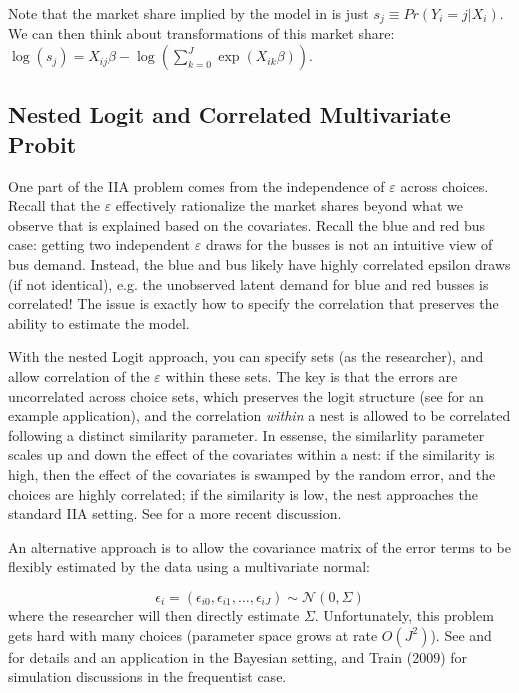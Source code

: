 \documentclass{tufte-handout}
\theoremstyle{break}
\begin{document}
Note that the market share implied by the model in  is just $s_{j} \equiv Pr(Y_{i}=j|X_{i})$. We can then think about transformations of this market share: $\log(s_{j}) = X_{ij}\beta - \log(\sum_{k=0}^{J}\exp(X_{ik}\beta))$. 

\subsection{Nested Logit and Correlated Multivariate Probit}

One part of the IIA problem comes from the independence of $\varepsilon$ across choices. Recall that the $\varepsilon$ effectively rationalize the market shares beyond what we observe that is explained based on the covariates. Recall the blue and red bus case: getting two independent $\varepsilon$ draws for the busses is not an intuitive view of bus demand. Instead, the blue and bus likely have highly correlated epsilon draws (if not identical), e.g. the unobserved latent demand for blue and red busses is correlated!  The issue is exactly how to specify the correlation  that preserves the ability to estimate the model.

With the nested Logit approach, you can specify sets (as the researcher), and allow correlation of the $\varepsilon$ within these sets. The key is that the errors are uncorrelated across choice sets, which preserves the logit structure (see \citet{goldberg1995product} for an example application), and the correlation \emph{within} a nest is allowed to be correlated following a distinct similarity parameter. In essense, the similarlity parameter scales up and down the effect of the covariates within a nest: if the similarity is high, then the effect of the covariates is swamped by the random error, and the choices are highly correlated; if the similarity is low, the nest approaches the standard IIA setting. See \citet{wen2001generalized} for a more recent discussion.
    
An alternative approach is to allow the covariance matrix of the error terms to be flexibly estimated by the data using a multivariate normal:

\begin{equation}
  \epsilon_{i} = (\epsilon_{i0},\epsilon_{i1},\ldots, \epsilon_{iJ}) \sim \mathcal{N}(0, \Sigma)
\end{equation}
where the researcher will then directly estimate $\Sigma$.  Unfortunately, this problem gets hard with many choices (parameter space grows at rate $O(J^{2})$).   See \citet{mcculloch2000bayesian} and \citet{geweke2003bayesian} for details and an application in the Bayesian setting, and Train (2009) for simulation discussions in  the frequentist case.
\end{document}
